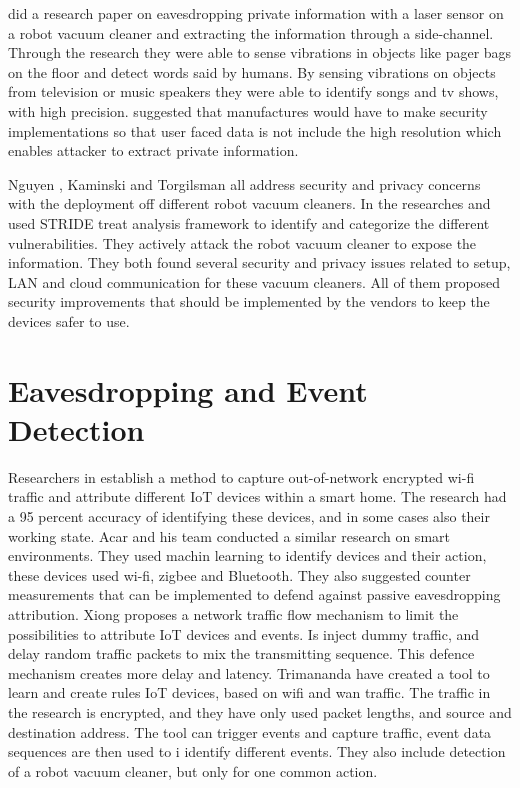 \cite{lindaeavesdropping} did a research paper on eavesdropping private information with a laser sensor on a robot vacuum cleaner and extracting the information through a side-channel. Through the research they were able to sense vibrations in objects like pager bags on the floor and detect words said by humans. By sensing vibrations on objects from television or music speakers they were able to identify songs and tv shows, with high precision. \cite{lindaeavesdropping} suggested that manufactures would have to make security implementations so that user faced data is not include the high resolution which enables attacker to extract private information.

Nguyen \cite{robotvacuum_voulne_nguyendeep}, Kaminski \cite{robotvacuum_voulne1_kaminski2016averting} and Torgilsman \cite{robotvacuum_voulne2_torgilsman2020ethical} all address security and privacy concerns with the deployment off different robot vacuum cleaners. In the researches \cite{robotvacuum_voulne_nguyendeep} and \cite{robotvacuum_voulne2_torgilsman2020ethical} used STRIDE treat analysis framework to identify and categorize the different vulnerabilities. They actively attack the robot vacuum cleaner to expose the information. They both found several security and privacy issues related to setup, LAN and cloud communication for these vacuum cleaners. All of them proposed security improvements that should be implemented by the vendors to keep the devices safer to use. 

\section{Eavesdropping and Event Detection}
Researchers in \cite{Eavs_relat_alyami2022wifi} establish a method to capture out-of-network encrypted wi-fi traffic and attribute different IoT devices within a smart home. The research had a 95 percent accuracy of identifying these devices, and in some cases also their working state. Acar \cite{evas_relat_acar2020peek} and his team conducted a similar research on smart environments. They used machin learning to identify devices and their action, these devices used wi-fi, zigbee and Bluetooth. They also suggested counter measurements that can be implemented to defend against passive eavesdropping attribution.
Xiong \cite{evas_relat_xiong2022network} proposes a network traffic flow mechanism to limit the possibilities to attribute IoT devices and events. Is inject dummy traffic, and delay random traffic packets to mix the transmitting sequence. This defence mechanism creates more delay and latency. 
Trimananda \cite{pingpong_trimananda2020packet} have created a tool to learn and create rules IoT devices, based on wifi and wan traffic. The traffic in the research is encrypted, and they have only used packet lengths, and source and destination address. The tool can trigger events and capture traffic, event data sequences are then used to i identify different events. They also include detection of a robot vacuum cleaner, but only for one common action. 